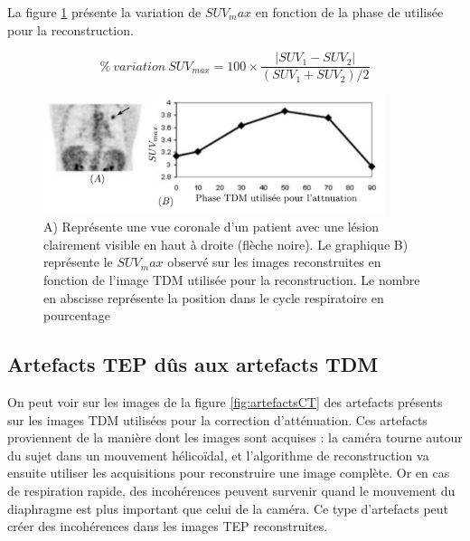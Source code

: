La figure \ref{fig:lesionEnFctPhaseTDM} présente la variation de $SUV_max$ en fonction de la phase de utilisée pour la reconstruction.

\begin{equation}
\label{eq:varSUV}
 \%~variation~SUV_{max} = 100 \times \frac{ | SUV_1 - SUV_2 | }{ (SUV_1 + SUV_2) / 2 }
\end{equation}

\begin{figure}[h!]
	\vspace{0.5cm}
	\centering
			\includegraphics[width=10cm]{images/lesionEnFctPhaseTDM}
	\vspace{-0.5cm}
	\caption{A) Représente une vue coronale d'un patient avec une lésion clairement visible en haut à droite (flèche noire). Le graphique B) représente le $SUV_max$ observé sur les images reconstruites en fonction de l'image TDM utilisée pour la reconstruction. Le nombre en abscisse représente la position dans le cycle respiratoire en pourcentage} 
	\label{fig:lesionEnFctPhaseTDM}
\end{figure}

\subsection{Artefacts TEP dûs aux artefacts TDM}

On peut voir sur les images de la figure \ref{fig:artefactsCT} des artefacts présents sur les images TDM utilisées pour la correction d'atténuation. Ces artefacts proviennent de la manière dont les images sont acquises : la caméra tourne autour du sujet dans un mouvement hélicoïdal, et l'algorithme de reconstruction va ensuite utiliser les acquisitions pour reconstruire une image complète. Or en cas de respiration rapide, des incohérences peuvent survenir quand le mouvement du diaphragme est plus important que celui de la caméra. Ce type d'artefacts peut créer des incohérences dans les images TEP reconstruites.

